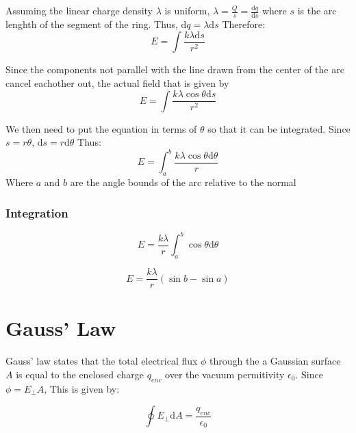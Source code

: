 \documentclass[a4paper,12pt]{article}
\begin{document}
								Assuming the linear charge density $\lambda$ is uniform, $\lambda = \frac{Q}{s} = \frac{\mathrm{d}{q}}{\mathrm{d}s}$ where $s$ is the arc lenghth of the segment of the ring. Thus, $\mathrm{d}q = \lambda \mathrm{d}s$ Therefore:
								\begin{equation*}
										E = \int \frac{k\lambda \mathrm{d}s}{r^{2}}
								\end{equation*}
								
								Since the components not parallel with the line drawn from the center of the arc cancel eachother out, the actual field that is given by 
								\begin{equation*}
										E = \int \frac{k\lambda \cos{\theta} \mathrm{d}s}{r^{2}}
								\end{equation*}

								We then need to put the equation in terms of $\theta$ so that it can be integrated. Since $s = r\theta$, $\mathrm{d}s = r\mathrm{d}\theta$ Thus:
								\begin{equation*}
										E = \int_{a}^{b} \frac{k\lambda \cos{\theta}\mathrm{d}\theta}{r}
								\end{equation*}
								Where $a$ and $b$ are the angle bounds of the arc relative to the normal
								
						\subsubsection{Integration}
								\begin{equation*}
										E =\frac{k\lambda}{r}  \int_{a}^{b} \cos{\theta}\mathrm{d}\theta
								\end{equation*}
										
								\begin{equation*}
										E = \frac{k\lambda}{r} (\sin{b} - \sin{a})
								\end{equation*}
				\setcounter{subsubsection}{0}
			\setcounter{subsection}{0}

		\section{Gauss' Law}
				Gauss' law states that the total electrical flux $\phi$ through the a Gaussian surface $A$ is equal to the enclosed charge $q_{enc}$ over the vacuum permitivity $\epsilon_{0}$. Since $\phi = E_{\bot} A$, This is given by:

				\begin{equation*}
						\oint E_{ \bot} \mathrm{d}A = \frac{q_{enc}}{\epsilon_{0}}
				\end{equation*}
\end{document}
